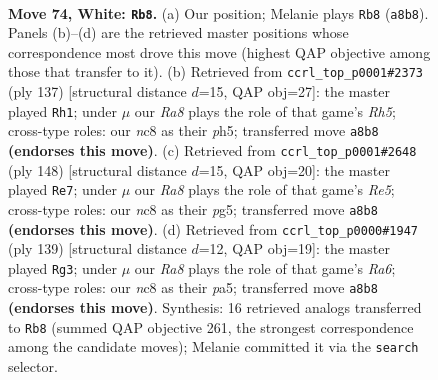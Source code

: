 \documentclass[11pt]{article}
\begin{document}
\clearpage

\begin{figure}[p]\centering
\begin{subfigure}{0.46\textwidth}\centering
\resizebox{\linewidth}{!}{%
\newchessgame
\chessboard[
  setfen={R1n5/3k4/8/8/p6r/P6p/7K/8 w - - 6 74},
  showmover=false,
  pgfstyle=straightmove, color=movearrow, markmove={a8-b8}
]}
\caption{}
\end{subfigure}\hfill
\begin{subfigure}{0.46\textwidth}\centering
\resizebox{\linewidth}{!}{%
\newchessgame
\chessboard[
  setfen={8/8/4k3/4P1RP/7r/5K2/8/8 b - - 4 69},
  showmover=false,
  pgfstyle=straightmove, color=movearrow, markmove={h4-h1}
]}
\caption{}
\end{subfigure}
\\[4pt]
\begin{subfigure}{0.46\textwidth}\centering
\resizebox{\linewidth}{!}{%
\newchessgame
\chessboard[
  setfen={8/8/3r2k1/4R1p1/6P1/3p1P2/3K4/8 w - - 6 75},
  showmover=false,
  pgfstyle=straightmove, color=movearrow, markmove={e5-e7}
]}
\caption{}
\end{subfigure}\hfill
\begin{subfigure}{0.46\textwidth}\centering
\resizebox{\linewidth}{!}{%
\newchessgame
\chessboard[
  setfen={8/6p1/7p/PR5P/7k/r7/2K5/8 b - - 10 70},
  showmover=false,
  pgfstyle=straightmove, color=movearrow, markmove={a3-g3}
]}
\caption{}
\end{subfigure}
\caption{\textbf{Move 74, White: \texttt{Rb8}.} (a) Our position; Melanie plays \texttt{Rb8} (\texttt{a8b8}). Panels (b)--(d) are the retrieved master positions whose correspondence most drove this move (highest QAP objective among those that transfer to it). (b) Retrieved from \texttt{ccrl\_top\_p0001\#2373} (ply 137) [structural distance $d$=15, QAP obj=27]: the master played \texttt{Rh1}; under $\mu$ our \emph{Ra8} plays the role of that game's \emph{Rh5}; cross-type roles: our \emph{n}c8 as their \emph{p}h5; transferred move \texttt{a8b8} \textbf{(endorses this move)}. (c) Retrieved from \texttt{ccrl\_top\_p0001\#2648} (ply 148) [structural distance $d$=15, QAP obj=20]: the master played \texttt{Re7}; under $\mu$ our \emph{Ra8} plays the role of that game's \emph{Re5}; cross-type roles: our \emph{n}c8 as their \emph{p}g5; transferred move \texttt{a8b8} \textbf{(endorses this move)}. (d) Retrieved from \texttt{ccrl\_top\_p0000\#1947} (ply 139) [structural distance $d$=12, QAP obj=19]: the master played \texttt{Rg3}; under $\mu$ our \emph{Ra8} plays the role of that game's \emph{Ra6}; cross-type roles: our \emph{n}c8 as their \emph{p}a5; transferred move \texttt{a8b8} \textbf{(endorses this move)}. Synthesis: 16 retrieved analogs transferred to \texttt{Rb8} (summed QAP objective 261, the strongest correspondence among the candidate moves); Melanie committed it via the \texttt{search} selector.}
\label{fig:thought-m146}
\end{figure}
\end{document}
